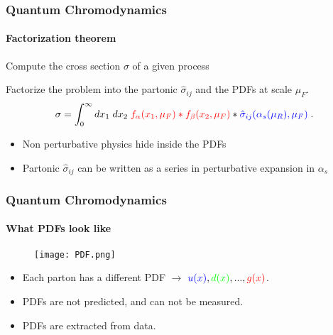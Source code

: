 \documentclass[aspectratio=43]{beamer}
\begin{document}
\begin{frame}

\frametitle{Quantum Chromodynamics}
\framesubtitle{Factorization theorem}

	Compute the cross section $\sigma$ of a given process
	
	\begin{figure}
	\end{figure}

	Factorize the problem into the partonic $\hat{\sigma}_{i j}$ and the PDFs at scale $\mu_{F}$.
	\begin{equation}
		\sigma = \int_{0}^{\infty} dx_{1} \; dx_{2} \; {\color{red} f_{\alpha}(x_{1}, \mu_{F}) \ast f_{\beta}(x_{2}, \mu_{F})} \ast {\color{blue}\hat{\sigma}_{i j}(\alpha_{s}(\mu_{R}), \mu_{F})} \; . \nonumber
	\end{equation}
	
	\begin{itemize}
		\item Non perturbative physics hide inside the PDFs
		\item Partonic $\hat{\sigma}_{ij}$ can be written as a series in perturbative expansion in $\alpha_{s}$
	\end{itemize}
	
\end{frame}


\begin{frame}

	\frametitle{Quantum Chromodynamics}
	\framesubtitle{What PDFs look like}
	
	\begin{figure}
		\texttt{[image: PDF.png]}
	\end{figure}
	
	\begin{itemize}
		\item Each parton has a different PDF $\longrightarrow$ ${\color{blue}u(x)}, {\color{green}d(x)}, ..., {\color{red}g(x)}$.
		\item PDFs are not predicted, and can not be measured.
		\item PDFs are {\color{blue}extracted} from data.
	\end{itemize}
\end{frame}
\end{document}
